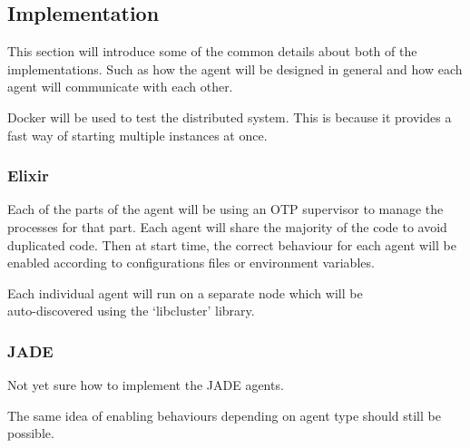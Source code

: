 \subsection{Implementation}

This section will introduce some of the common details about both of the implementations.
Such as how the agent will be designed in general and how each agent will communicate with each other.

Docker will be used to test the distributed system.
This is because it provides a fast way of starting multiple instances at once.

\subsubsection{Elixir}

Each of the parts of the agent will be using an OTP supervisor to manage the processes for that part.
Each agent will share the majority of the code to avoid duplicated code.
Then at start time, the correct behaviour for each agent will be enabled according to configurations files or environment variables.

Each individual agent will run on a separate node which will be\\auto-discovered using the `libcluster' library.

\subsubsection{JADE}

Not yet sure how to implement the JADE agents.

The same idea of enabling behaviours depending on agent type should still be possible.
